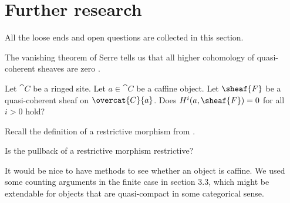 \chapter{Further research}

All the loose ends and open questions are collected in this section.

The vanishing theorem of Serre tells us that all higher cohomology
of quasi-coherent sheaves are zero \cite[\href{http://stacks.math.columbia.edu/tag/01XB}{Tag 01XB}]{stacks}.

\begin{question}
Let $\cat{C}$ be a ringed site.
Let $a\in \cat{C}$ be a caffine object.
Let $\sheaf{F}$ be a quasi-coherent sheaf on $\overcat{C}{a}$.
Does $H^i(a,\sheaf{F}) = 0$ for all $i>0$ hold?
\end{question}

Recall the definition of a restrictive morphism from .

\begin{question}
Is the pullback of a restrictive morphism restrictive?
\end{question}

It would be nice to have methods to see whether an object is caffine.
We used some counting arguments in the finite case in section 3.3, 
which might be extendable for objects that are quasi-compact in some categorical sense.